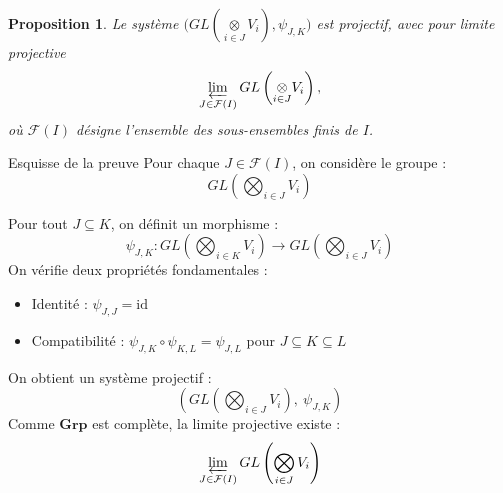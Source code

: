 \documentclass[9pt]{beamer}
\newtheorem{proposition}{Proposition}
\begin{document}
\begin{frame}
\begin{proposition}\label{prop2}
Le système $\big(GL(\underset{i \in J}{\otimes} V_i), \psi_{J,K} \big)$ est projectif, avec pour limite projective
	\[
	\varprojlim_{J \in \mathcal{F}(I)} GL\left(\underset{i \in J}{\otimes} V_i\right),
	\]
	où $\mathcal{F}(I)$ désigne l’ensemble des sous-ensembles finis de $I$.
\end{proposition}

\end{frame}


\begin{frame}{Esquisse de la preuve}
	Pour chaque \( J \in \mathcal{F}(I) \), on considère le groupe :
	\[
	GL\left( \bigotimes_{i \in J} V_i \right)
	\]
	

	Pour tout \( J \subseteq K \), on définit un morphisme :
	\[
	\psi_{J,K} :
	GL\left( \bigotimes_{i \in K} V_i \right)
	\longrightarrow
	GL\left( \bigotimes_{i \in J} V_i \right)
	\]
On vérifie deux propriétés fondamentales :
	\begin{itemize}
		\item Identité : \( \psi_{J,J} = \mathrm{id} \)
		\item Compatibilité : \( \psi_{J,K} \circ \psi_{K,L} = \psi_{J,L} \) pour \( J \subseteq K \subseteq L \)
	\end{itemize}
	
	On obtient un système projectif :
	\[
	\left( GL\left( \bigotimes_{i \in J} V_i \right),\ \psi_{J,K} \right)
	\]	
Comme \( \mathbf{Grp} \) est complète, la limite projective existe :
\[
\varprojlim_{J \in \mathcal{F}(I)} GL\left( \bigotimes_{i \in J} V_i \right)
\]
\end{frame}
\end{document}
